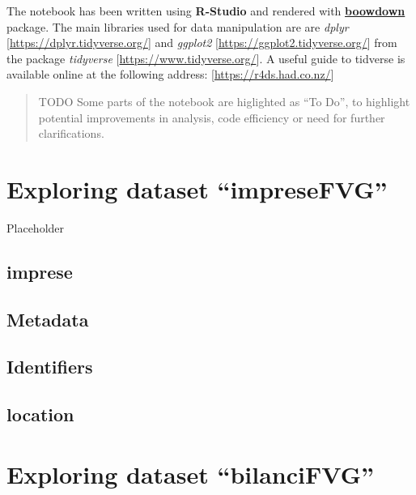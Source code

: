 \documentclass[
]{scrbook}
\begin{document}
The notebook has been written using \textbf{R-Studio} and rendered with \href{https://bookdown.org/}{\textbf{boowdown}} package.
The main libraries used for data manipulation are are \emph{dplyr} {[}\url{https://dplyr.tidyverse.org/}{]} and \emph{ggplot2} {[}\url{https://ggplot2.tidyverse.org/}{]} from the package \emph{tidyverse} {[}\url{https://www.tidyverse.org/}{]}. A useful guide to tidverse is available online at the following address: {[}\url{https://r4ds.had.co.nz/}{]}

\begin{quote}
TODO Some parts of the notebook are higlighted as ``To Do'', to highlight potential improvements in analysis, code efficiency or need for further clarifications.
\end{quote}

\hypertarget{exploring-dataset-impresefvg}{%
\chapter*{Exploring dataset ``impreseFVG''}\label{exploring-dataset-impresefvg}}

Placeholder

\hypertarget{imprese}{%
\section{imprese}\label{imprese}}

\hypertarget{metadata}{%
\section{Metadata}\label{metadata}}

\hypertarget{identifiers}{%
\section{Identifiers}\label{identifiers}}

\hypertarget{location}{%
\section{location}\label{location}}

\hypertarget{exploring-dataset-bilancifvg}{%
\chapter*{Exploring dataset ``bilanciFVG''}\label{exploring-dataset-bilancifvg}}
\end{document}
